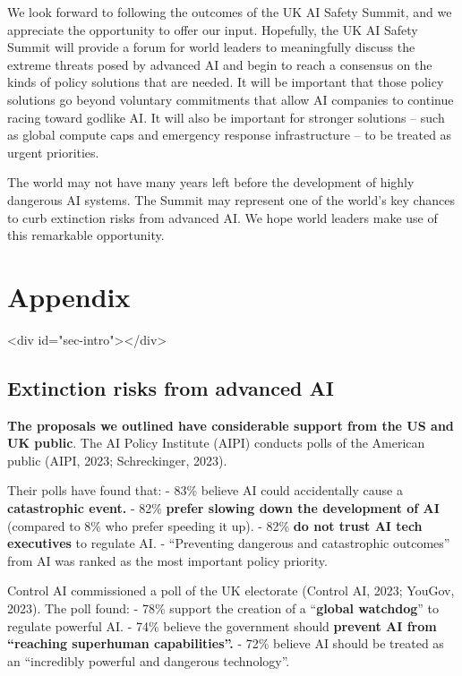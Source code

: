 \documentclass[12pt,a4paper]{article}
\begin{document}
We look forward to following the outcomes of the UK AI Safety Summit, and we appreciate the opportunity to offer our input. Hopefully, the UK AI Safety Summit will provide a forum for world leaders to meaningfully discuss the extreme threats posed by advanced AI and begin to reach a consensus on the kinds of policy solutions that are needed. It will be important that those policy solutions go beyond voluntary commitments that allow AI companies to continue racing toward godlike AI. It will also be important for stronger solutions – such as global compute caps and emergency response infrastructure – to be treated as urgent priorities. 

The world may not have many years left before the development of highly dangerous AI systems. The Summit may represent one of the world’s key chances to curb extinction risks from advanced AI. We hope world leaders make use of this remarkable opportunity. 

\newpage
\section{Appendix}<div id="sec-intro"></div>

\subsection{Extinction risks from advanced AI} 
\textbf{The proposals we outlined have considerable support from the US and UK public}. The AI Policy Institute (AIPI) conducts polls of the American public (AIPI, 2023; Schreckinger, 2023). 

Their polls have found that:
-  83\% believe AI could accidentally cause a \textbf{catastrophic event.}
-  82\% \textbf{prefer slowing down the development of AI} (compared to 8\% who prefer speeding it up).
-  82\%\textbf{ do not trust AI tech executives }to regulate AI.
-  “Preventing dangerous and catastrophic outcomes” from AI was ranked as the most important policy priority.


Control AI commissioned a poll of the UK electorate (Control AI, 2023; YouGov, 2023). The poll found:
-  78\% support the creation of a “\textbf{global watchdog}” to regulate powerful AI.
-  74\% believe the government should \textbf{prevent AI from “reaching superhuman capabilities”.}
-  72\% believe AI should be treated as an “incredibly powerful and dangerous technology”.

\pagebreak



\sloppy
\end{document}
